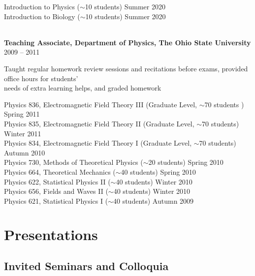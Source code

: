 \documentclass[11pt]{../yhlcv}
\begin{document}
Introduction to Physics ($\sim$10 students) \hfill Summer 2020 \\
Introduction to Biology ($\sim$10 students) \hfill Summer 2020 \\

\ \

{\bf Teaching Associate, Department of Physics, The Ohio State University} \hfill 2009 -- 2011\vspace{0.5em}

Taught regular homework review sessions and recitations before exams, provided office hours
for students' \\ needs of extra learning helps, and graded homework \vspace{0.5em}

Physics 836, Electromagnetic Field Theory III (Graduate Level, $\sim$70 students ) \hfill Spring 2011\\
Physics 835, Electromagnetic Field Theory II (Graduate Level, $\sim$70 students) \hfill  Winter 2011 \\
Physics 834, Electromagnetic Field Theory I (Graduate Level, $\sim$70 students) \hfill Autumn 2010 \\
Physics 730, Methods of Theoretical Physics ($\sim$20 students) \hfill Spring 2010 \\
Physics 664, Theoretical Mechanics ($\sim$40 students) \hfill Spring 2010 \\
Physics 622, Statistical Physics II ($\sim$40 students) \hfill Winter 2010 \\
Physics 656, Fields and Waves II ($\sim$40 students) \hfill Winter 2010 \\
Physics 621, Statistical Physics I ($\sim$40 students) \hfill Autumn 2009

\section*{Presentations}

\subsection*{Invited Seminars and Colloquia}
\end{document}
